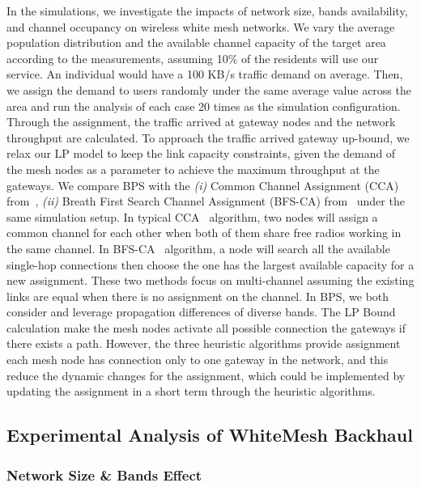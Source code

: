 In the simulations, we investigate the impacts of network size, bands availability, and 
channel occupancy on wireless white mesh networks. We vary the average population distribution 
and the available channel capacity of the target area according to the measurements, assuming 10\% of 
the residents will use our service. An individual would have a 100 KB/s traffic demand on average. 
Then, we assign the demand to users randomly under the same average value across the area and run 
the analysis of each case 20 times as the simulation configuration. Through the assignment, 
the traffic arrived at gateway nodes and the network throughput are calculated. To approach the 
traffic arrived gateway up-bound, we relax our LP model to keep the link capacity constraints, 
given the demand of the mesh nodes as a parameter to achieve the maximum throughput at the gateways. 
We compare BPS with the 
{\it (i)} Common Channel Assignment (CCA) from~\cite{draves2004routing},
{\it (ii)} Breath First Search Channel Assignment (BFS-CA) from~\cite{tang2005interference}
under the same simulation setup.
In typical CCA~\cite{draves2004routing} algorithm, two nodes will assign a common channel 
for each other when both of them share free radios working in the same channel. 
In BFS-CA~\cite{tang2005interference} algorithm, a node will search all the 
available single-hop connections then choose the one has the largest available capacity 
for a new assignment. These two methods focus on multi-channel assuming the existing 
links are equal when there is no assignment on the channel. In BPS, we both consider and 
leverage propagation differences of diverse bands.
The LP Bound calculation make the mesh nodes activate all possible connection 
the gateways if there exists a path. However, the three heuristic algorithms 
provide assignment each mesh node has connection only to one gateway in the 
network, and this reduce the dynamic changes for the assignment, which could be 
implemented by updating the assignment in a short term through the heuristic algorithms.

\subsection{Experimental Analysis of WhiteMesh Backhaul}
\label{subsec:wmanalysis}

\subsubsection{Network Size \& Bands Effect}

